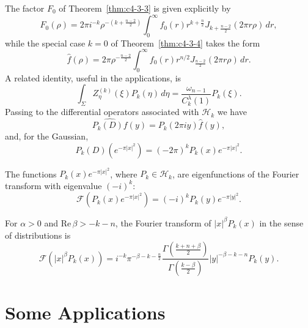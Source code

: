 The factor $F_0$ of Theorem~\ref{thm:c4-3-3} is given explicitly by
\begin{equation}\label{eq:c4-3-5}
F_0(\rho) = 2\pi i^{-k} \rho^{-\left(k + \frac{n-2}{2}\right)} \int_0^\infty f_0(r) r^{k + \frac{n}{2}} J_{k + \frac{n-2}{2}}(2\pi r \rho)\,dr,
\end{equation}
while the special case $k = 0$ of Theorem~\ref{thm:c4-3-4} takes the form
\begin{equation}\label{eq:c4-3-6}
\hat{f}(\rho) = 2\pi \rho^{-\frac{n-2}{2}} \int_0^\infty f_0(r) r^{n/2} J_{\frac{n-2}{2}}(2\pi r \rho)\,dr.
\end{equation}
A related identity, useful in the applications, is
\begin{equation}\label{eq:c4-3-7}
\int_\Sigma Z_\eta^{(k)}(\xi) P_k(\eta)\,d\eta = \frac{\omega_{n-1}}{C_k^\lambda(1)} P_k(\xi).
\end{equation}
Passing to the differential operators associated with $\mathcal{H}_k$ we have
\begin{equation}\label{eq:c4-3-8}
\widehat{P_k(D) f}(y) = P_k(2\pi i y) \hat{f}(y),
\end{equation}
and, for the Gaussian,
\begin{equation}\label{eq:c4-3-9}
P_k(D)(e^{-\pi |x|^2}) = (-2\pi)^k P_k(x) e^{-\pi |x|^2}.
\end{equation}

\begin{theorem}\label{thm:c4-3-10}
The functions $P_k(x) e^{-\pi |x|^2}$, where $P_k \in \mathcal{H}_k$, are eigenfunctions of the Fourier transform with eigenvalue $(-i)^k$:
\[
\mathcal{F}(P_k(x) e^{-\pi |x|^2}) = (-i)^k P_k(y) e^{-\pi |y|^2}.
\]
\end{theorem}

\begin{lemma}\label{lem:c4-3-11}
For $\alpha > 0$ and $\text{Re}\,\beta > -k - n$, the Fourier transform of $|x|^\beta P_k(x)$ in the sense of distributions is
\begin{equation}\label{eq:c4-3-12}
\mathcal{F}(|x|^\beta P_k(x)) = i^{-k} \pi^{-\beta - k - \frac{n}{2}} \frac{\Gamma\left(\frac{k + n + \beta}{2}\right)}{\Gamma\left(\frac{k - \beta}{2}\right)} |y|^{-\beta - k - n} P_k(y).
\end{equation}
\end{lemma}

\section{Some Applications}

